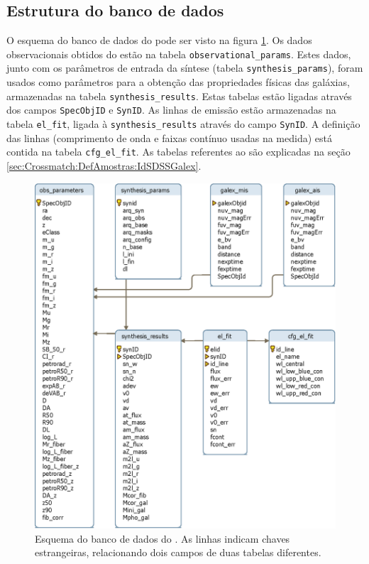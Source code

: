 \subsection{Estrutura do banco de dados}
\label{sec:Crossmatch:EstruturaBDStarlight}

O esquema do banco de dados do \starlight pode ser visto na figura
\ref{fig:EsquemaBDStarlight}. Os dados observacionais obtidos do \SDSS estão na
tabela \texttt{observational\_params}. Estes dados, junto com os parâmetros de
entrada da síntese (tabela \texttt{synthesis\_params}), foram usados como
parâmetros para a obtenção das propriedades físicas das galáxias, armazenadas na
tabela \texttt{synthesis\_results}. Estas tabelas estão ligadas através dos
campos \texttt{SpecObjID} e \texttt{SynID}. As linhas de emissão estão
armazenadas na tabela \texttt{el\_fit}, ligada à \texttt{synthesis\_results}
através do campo \texttt{SynID}. A definição das linhas (comprimento de onda e
faixas contínuo usadas na medida) está contida na tabela \texttt{cfg\_el\_fit}.
As tabelas referentes ao \galex são explicadas na seção
\ref{sec:Crossmatch:DefAmostras:IdSDSSGalex}.

\begin{figure}
	\includegraphics{figuras/starlight-schema.eps}
	\caption[Esquema do banco de dados do \starlight.]
	{Esquema do banco de dados do \starlight. As linhas indicam chaves
	estrangeiras, relacionando dois campos de duas tabelas diferentes.}
	\label{fig:EsquemaBDStarlight}
\end{figure}

